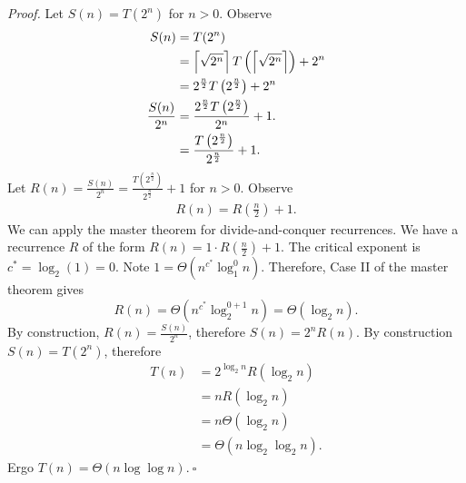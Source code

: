 \begin{enumerate}
\textit{Proof. }
Let $S(n)=T(2^n)$ for $n>0$. Observe
\begin{align*}
S(n)&=T(2^n)\\
&=\left\lceil\sqrt{2^n}\right\rceil T\left(\left\lceil\sqrt{2^n}\right\rceil\right)+2^n\\
&=2^{\frac{n}{2}}T\left(2^{\frac{n}{2}}\right)+2^n\\
\frac{S(n)}{2^n}&=\frac{2^{\frac{n}{2}}T\left(2^{\frac{n}{2}}\right)}{2^n}+1.\\
&=\frac{T\left(2^{\frac{n}{2}}\right)}{2^{\frac{n}{2}}}+1.
\end{align*}
Let $R(n)=\frac{S(n)}{2^n}=\frac{T\left(2^{\frac{n}{2}}\right)}{2^{\frac{n}{2}}}+1$ for $n>0$. Observe
\begin{align*}
R(n)=R\left(\frac{n}{2}\right)+1.
\end{align*}
We can apply the master theorem for divide-and-conquer recurrences. We have a recurrence $R$ of the form $R(n)=1\cdot R\left(\frac{n}{2}\right)+1$. The critical exponent is $c^*=\log_2(1)=0$. Note $1=\Theta(n^{c^*}\log_1^0 n)$. Therefore, Case II of the master theorem gives
\begin{equation*}
R(n)=\Theta(n^{c^*}\log_2^{0+1}n)=\Theta(\log_2n).
\end{equation*}
By construction, $R(n)=\frac{S(n)}{2^n}$, therefore $S(n)=2^nR(n)$. By construction $S(n)=T(2^n)$, therefore
\begin{align*}
T(n)&=2^{\log_2n}R(\log_2n)\\
&=nR(\log_2n)\\
&=n\Theta(\log_2n)\\
&=\Theta(n\log_2\log_2n).
\end{align*}
Ergo $T(n)=\Theta(n\log\log n)$.$~\square$
\end{enumerate}
\newpage
